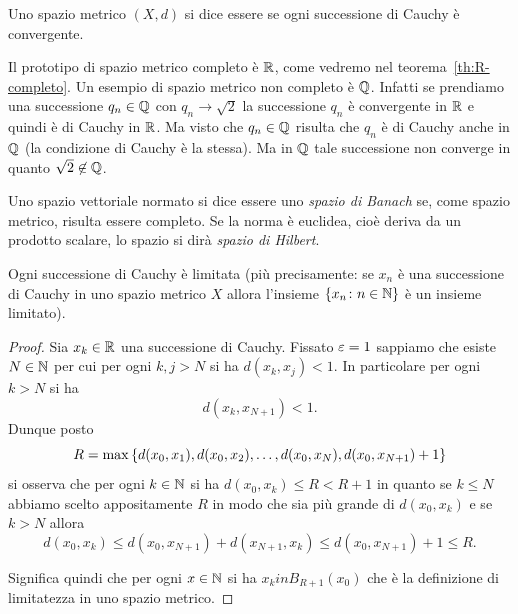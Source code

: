 \begin{definition}[completezza]
\mymark{***}
Uno spazio metrico $(X,d)$ si dice essere 
se ogni successione di Cauchy è convergente.
\end{definition}

Il prototipo di spazio metrico completo è $\mathbb R$, come vedremo nel teorema~\ref{th:R-completo}.
Un esempio di spazio metrico non completo è $\mathbb Q$.
Infatti se prendiamo una
successione $q_n \in\mathbb Q$ con $q_n\to \sqrt 2$ la successione $q_n$ è convergente
in $\mathbb R$ e quindi è di Cauchy in $\mathbb R$. Ma visto che $q_n\in \mathbb Q$ risulta
che $q_n$ è di Cauchy anche in $\mathbb Q$ (la condizione di Cauchy è la stessa).
Ma in $\mathbb Q$ tale successione non converge in quanto $\sqrt 2\not \in \mathbb Q$.

\begin{definition}
Uno spazio vettoriale normato si dice essere uno
\emph{spazio di Banach}%
%
%
se, come spazio metrico, risulta essere completo.
Se la norma è euclidea, cioè deriva da un prodotto scalare, lo spazio si dirà
\emph{spazio di Hilbert}.
%
\end{definition}

\begin{lemma}
\label{lm:cauchy_limitata}
Ogni successione di Cauchy è limitata
(più precisamente: se $x_n$ è una successione di Cauchy in uno spazio metrico $X$ allora l'insieme ${\left\{ x_n\colon n\in \mathbb N \right\}}$
è un insieme limitato).
\end{lemma}
%
\begin{proof}
Sia $x_k \in \mathbb R$ una successione di Cauchy.
Fissato $\varepsilon =1$ sappiamo che esiste $N\in \mathbb N$
per cui per ogni $k,j>N$ si ha
$d(x_k,x_j) < 1$. In particolare per ogni $k>N$ si ha
\[
  d(x_k, x_{N+1}) < 1.
\]
Dunque posto
\[
  R = \max{\left\{ d(x_0,x_1), d(x_0,x_2), \dots, d(x_0,x_N), d(x_0, x_{N+1}) + 1 \right\}}
\]
si osserva che per ogni $k\in \mathbb N$ si ha $d(x_0, x_k)\le R < R+1$ in quanto se $k \le N$ abbiamo scelto appositamente $R$ in modo che sia più grande di $d(x_0,x_k)$ e se $k > N$ allora
\[
  d(x_0,x_k) \le d(x_0,x_{N+1}) + d(x_{N+1},x_k)
    \le d(x_0,x_{N+1}) + 1 \le R.
\]

Significa quindi che per ogni $x\in \mathbb N$ si ha $x_k in B_{R+1}(x_0)$ che è la definizione di limitatezza in uno
spazio metrico.
\end{proof}

